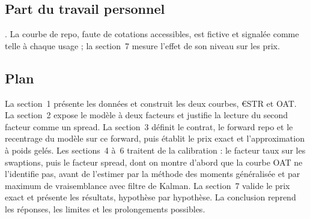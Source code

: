 \subsection*{Part du travail personnel}

. La courbe de
repo, faute de cotations accessibles, est fictive et signalée comme telle à chaque usage ; la section~7 mesure
l'effet de son niveau sur les prix.

\subsection*{Plan}

La section~1 présente les données et construit les deux courbes, €STR et OAT. La section~2 expose le modèle à
deux facteurs et justifie la lecture du second facteur comme un spread. La section~3 définit le contrat, le
forward repo et le recentrage du modèle sur ce forward, puis établit le prix exact et l'approximation à poids
gelés. Les sections~4 à~6 traitent de la calibration : le facteur taux sur les swaptions, puis le facteur
spread, dont on montre d'abord que la courbe OAT ne l'identifie pas, avant de l'estimer par la méthode des
moments généralisée et par maximum de vraisemblance avec filtre de Kalman. La section~7 valide le prix exact et
présente les résultats, hypothèse par hypothèse. La conclusion reprend les réponses, les limites et les
prolongements possibles.
